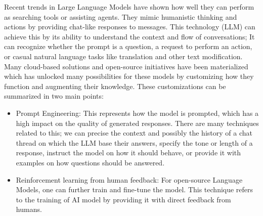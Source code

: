 Recent trends in Large Language Models have shown how well they can perform as searching tools or assisting agents. They mimic humanistic thinking and actions by providing chat-like responses to messages. This technology (LLM) can achieve this by its ability to understand the context and flow of conversations; It can recognize whether the prompt is a question, a request to perform an action, or casual natural language tasks like translation and other text modification. Many cloud-based solutions and open-source initiatives have been materialized which has unlocked many possibilities for these models by customizing how they function and augmenting their knowledge.\newpage
These customizations can be summarized in two main points:
\begin{itemize}
    \item Prompt Engineering: This represents how the model is prompted, which has a high impact on the quality of generated responses. There are many techniques related to this; we can precise the context and possibly the history of a chat thread on which the LLM base their answers, specify the tone or length of a response, instruct the model on how it should behave, or provide it with examples on how questions should be answered.
    \item Reinforcement learning from human feedback: For open-source Language Models, one can further train and fine-tune the model. This technique refers to the training of AI model by providing it with direct feedback from humans.
\end{itemize}
\newpage


